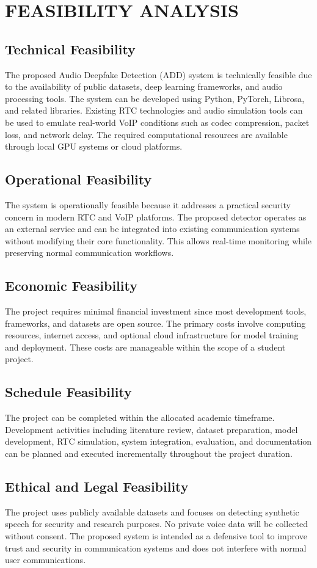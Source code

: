 \newpage
\section{FEASIBILITY ANALYSIS}

\subsection{Technical Feasibility}
The proposed Audio Deepfake Detection (ADD) system is technically feasible due to the availability of public datasets, deep learning frameworks, and audio processing tools. The system can be developed using Python, PyTorch, Librosa, and related libraries. Existing RTC technologies and audio simulation tools can be used to emulate real-world VoIP conditions such as codec compression, packet loss, and network delay. The required computational resources are available through local GPU systems or cloud platforms.

\subsection{Operational Feasibility}
The system is operationally feasible because it addresses a practical security concern in modern RTC and VoIP platforms. The proposed detector operates as an external service and can be integrated into existing communication systems without modifying their core functionality. This allows real-time monitoring while preserving normal communication workflows.

\subsection{Economic Feasibility}
The project requires minimal financial investment since most development tools, frameworks, and datasets are open source. The primary costs involve computing resources, internet access, and optional cloud infrastructure for model training and deployment. These costs are manageable within the scope of a student project.

\subsection{Schedule Feasibility}
The project can be completed within the allocated academic timeframe. Development activities including literature review, dataset preparation, model development, RTC simulation, system integration, evaluation, and documentation can be planned and executed incrementally throughout the project duration.

\subsection{Ethical and Legal Feasibility}
The project uses publicly available datasets and focuses on detecting synthetic speech for security and research purposes. No private voice data will be collected without consent. The proposed system is intended as a defensive tool to improve trust and security in communication systems and does not interfere with normal user communications.